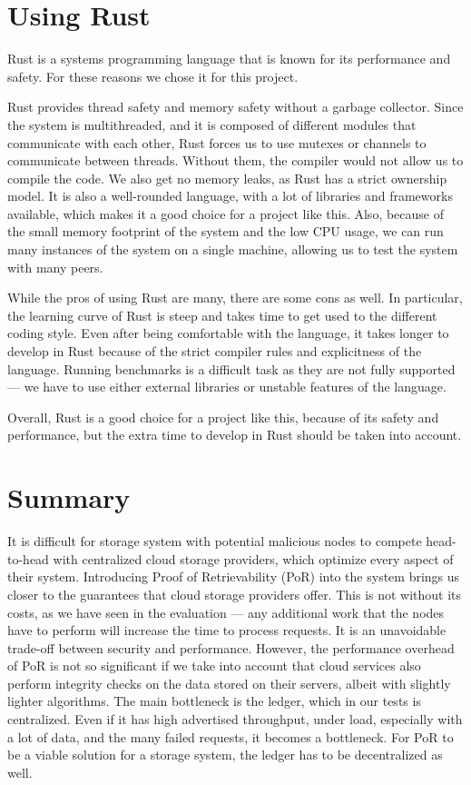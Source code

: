 

\section{Using Rust}

Rust is a systems programming language that is known for its performance and safety.
For these reasons we chose it for this project.

Rust provides thread safety and memory safety without a garbage collector.
Since the system is multithreaded, and it is composed of different modules
that communicate with each other, Rust forces us to use mutexes or channels
to communicate between threads.
Without them, the compiler would not allow us to compile the code.
We also get no memory leaks, as Rust has a strict ownership model.
It is also a well-rounded language, with a lot of libraries and frameworks available,
which makes it a good choice for a project like this.
Also, because of the small memory footprint of the system and the low CPU usage,
we can run many instances of the system on a single machine,
allowing us to test the system with many peers.

While the pros of using Rust are many, there are some cons as well.
In particular, the learning curve of Rust is steep and takes time to get used to
the different coding style.
Even after being comfortable with the language, it takes longer to develop in Rust
because of the strict compiler rules and explicitness of the language.
Running benchmarks is a difficult task as they are not fully supported ---
we have to use either external libraries or unstable features of the language.

Overall, Rust is a good choice for a project like this, because of its safety and performance,
but the extra time to develop in Rust should be taken into account.

\section{Summary}

It is difficult for storage system with potential malicious nodes to compete
head-to-head with centralized cloud storage providers, which optimize every aspect of their system.
Introducing Proof of Retrievability (PoR) into the system brings us closer to the guarantees
that cloud storage providers offer.
This is not without its costs, as we have seen in the evaluation --- any additional work
that the nodes have to perform will increase the time to process requests.
It is an unavoidable trade-off between security and performance.
However, the performance overhead of PoR is not so significant if we take into account that
cloud services also perform integrity checks on the data stored on their servers,
albeit with slightly lighter algorithms.
The main bottleneck is the ledger, which in our tests is centralized.
Even if it has high advertised throughput, under load, especially with a lot of data,
and the many failed requests, it becomes a bottleneck.
For PoR to be a viable solution for a storage system, the ledger has to be decentralized as well.
